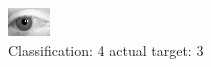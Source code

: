 \begin{figure}[h!]
\begin{center}
\includegraphics[width=0.60\columnwidth]{figures/ID2790_class_4_target_3.png}
\end{center}
\caption{ Classification: 4 actual target: 3}
\label{fig:ID2790_class_4_target_3}
\end{figure}
